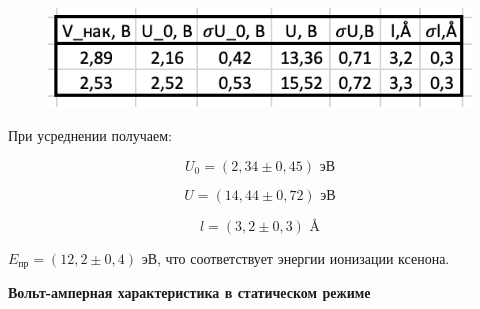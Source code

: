 \documentclass[a4paper, 12pt]{article}%
\begin{document}
\begin{enumerate}
	\begin{figure}[h!]
		\centering
		\includegraphics[scale=1]{Таблица_2.PNG}
	\end{figure}	

	При усреднении получаем: 
	
\[U_0 = (2,34 \pm 0,45) \text{ эВ} \]

\[ U = (14,44 \pm 0,72) \text{ эВ} \]

\[ l = (3,2 \pm 0,3) \text{ \AA } \]

$E_{\text{пр}} = (12,2 \pm 0,4)$ эВ,  что соответствует энергии ионизации ксенона.

\end{enumerate}

\textbf{Вольт-амперная характеристика в статическом режиме}
\end{document}
